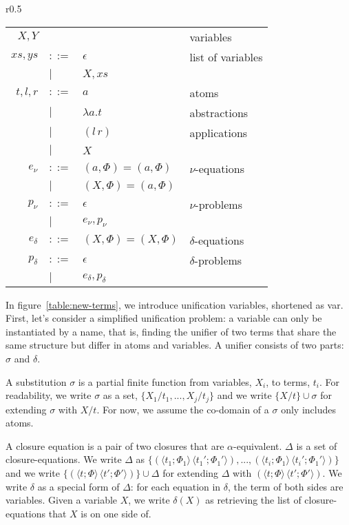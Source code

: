 \documentclass[a4paper,UKenglish]{lipics-v2016}
\newcommand{\clos}[2] {
  \langle #1; #2 \rangle
}
\newcommand{\app}[2] {
  (#1\, #2)
}
\newcommand{\pr}[2] {
 (#1\, #2)
}
\newcommand{\bd}[2] {
 #1/ #2
}
\begin{document}
\label{unify}
\begin{wrapfigure}{r}{0.5\textwidth}
  \caption{Unification terms and problems\label{table:new-terms}}
    \begin{tabular}{r l l l}  
    $X,Y$   &       &     & variables \\
      $xs,ys$ & $::=$ & $\epsilon$& list of variables \\
      & $|$&  $X,xs$ &  \\
    $t,l,r$ & $::=$ & $a$ & atoms \\
    & $|$ & $\lambda a.t$ & abstractions \\
    & $|$ & $\app{l}{r}$ & applications \\
      & $|$ & $X$ & \\
      $e_\nu$  & $::=$ & $(a,\Phi) = (a,\Phi)$ & $\nu$-equations \\
           & $|$ &  $(X,\Phi) = (a,\Phi)$ \\
      $p_\nu$  & $::=$ & $\epsilon$ & $\nu$-problems \\
           & $|$ & $e_\nu, p_\nu$ \\
      $e_\delta$  & $::=$& $(X,\Phi) = (X,\Phi)$ & $\delta$-equations \\
      $p_\delta$  & $::=$ & $\epsilon$ & $\delta$-problems \\
           & $|$ & $e_\delta, p_\delta$
    \end{tabular}
\end{wrapfigure}

In figure~\ref{table:new-terms}, we introduce unification variables,
shortened as var.  First, let's consider a simplified unification
problem: a variable can only be instantiated by a name, that is,
finding the unifier of two terms that share the same structure but
differ in atoms and variables.  A unifier consists of two parts:
$\sigma$ and $\delta$.
\begin{definition}
  A substitution $\sigma$ is a partial finite function from variables,
  $X_i$, to terms, $t_i$.  For readability, we write $\sigma$ as a
  set, $\{\bd{X_1}{t_1}, ..., \bd{X_j}{t_j}\}$ and we write
  $\{\bd{X}{t}\} \cup \sigma$ for extending $\sigma$ with $\bd{X}{t}$.
  For now, we assume the co-domain of a $\sigma$ only includes atoms.
\end{definition}

\begin{definition}
  A closure equation is a pair of two closures that are
  $\alpha$-equivalent.  $\Delta$ is a set of closure-equations.  We
  write $\Delta$ as $\{\pr{\clos{t_1}{\Phi_1}}{\clos{t_1'}{\Phi_1'}},
  ..., \pr{\clos{t_i}{\Phi_1}}{\clos{t_i'}{\Phi_1'}}\}$ and we write
  $\{\pr{\clos{t}{\Phi}}{\clos{t'}{\Phi'}}\}\cup\Delta$ for extending
  $\Delta$ with $\pr{\clos{t}{\Phi}}{\clos{t'}{\Phi'}}$.  We write
  $\delta$ as a special form of $\Delta$: for each equation in
  $\delta$, the term of both sides are variables.  Given a variable
  $X$, we write $\delta(X)$ as retrieving the list of
  closure-equations that $X$ is on one side of.
\end{definition}
\end{document}

